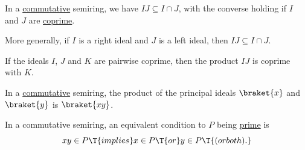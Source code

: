 \begin{proposition}
\begin{thmenum}
     In a \hyperref[def:semiring/commutative]{commutative} semiring, we have \( IJ \subseteq I \cap J \), with the converse holding if \( I \) and \( J \) are \hyperref[def:semiring_ideal/coprime]{coprime}.

    More generally, if \( I \) is a right ideal and \( J \) is a left ideal, then \( IJ \subseteq I \cap J \).

     If the ideals \( I \), \( J \) and \( K \) are pairwise coprime, then the product \( IJ \) is coprime with \( K \).

     In a \hyperref[def:semiring/commutative]{commutative} semiring, the product of the principal ideals \( \braket{x} \) and \( \braket{y} \) is \( \braket{xy} \).

     In a commutative semiring, an equivalent condition to \( P \) being \hyperref[def:semiring_ideal/prime]{prime} is
    \begin{equation}\label{eq:thm:def:semiring_ideal/prime_pointwise}
      xy \in P \T{implies} x \in P \T{or} y \in P \T{(or both).}
    \end{equation}
  \end{thmenum}
\end{proposition}

